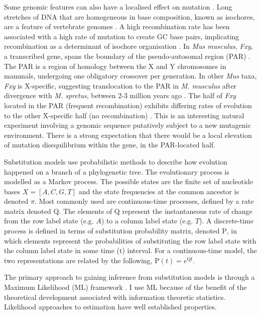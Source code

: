 Some genomic features can also have a localised effect on mutation \citep{Lynch2016GeneticRate}. Long stretches of DNA that are homogeneous in base composition, known as isochores, are a feature of vertebrate genomes \citep{Bernardi1989TheGenome, Bernardi2000IsochoresVertebrates}. A high recombination rate has been associated with a high rate of mutation to create GC base pairs, implicating recombination as a determinant of isochore organisation \citep{Montoya-Burgos2003RecombinationGenomes}. In  \textit{Mus musculus}, \textit{Fxy}, a transcribed gene, spans the boundary of the pseudo-autosomal region (PAR) \citep{Palmer1997AMice}. The PAR is a region of homology between the X and Y chromosomes in mammals, undergoing one obligatory crossover per generation.  In other \textit{Mus} taxa, \textit{Fxy} is X-specific, suggesting translocation to the PAR in \textit{M. musculus} after divergence with \textit{M. spretus}, between 2-3 million years ago \citep{Huang2005HowMammals}. The half of \textit{Fxy} located in the PAR (frequent recombination) exhibits differing rates of evolution to the other X-specific half (no recombination) \citep{Perry1999EvolutionaryPosition}. This is an interesting natural experiment involving a genomic sequence putatively subject to a new mutagenic environment. There is a strong expectation that there would be a local elevation of mutation disequilibrium within the gene, in the PAR-located half. 

Substitution models use probabilistic methods to describe how evolution happened on a branch of a phylogenetic tree. The evolutionary process is modelled as a Markov process. The possible states are the finite set of nucleotide bases $X = [A, C, G, T]$ and the state frequencies at the common ancestor is denoted $\pi$. Most commonly used are continuous-time processes, defined by a rate matrix denoted $\mathrm{Q}$. The elements of $\mathrm{Q}$ represent the instantaneous rate of change from the row label state (e.g. $A$) to a column label state (e.g. $T$). A discrete-time process is defined in terms of substitution probability matrix, denoted $\mathrm{P}$, in which elements represent the probabilities of substituting the row label state with the column label state in some time (t) interval. For a continuous-time model, the two representations are related by the following, $\mathrm{P}(t) = e^{\mathrm{Q}t}$. 

The primary approach to gaining inference from substitution models is through a Maximum Likelihood (ML) framework \citep{Whelan2001MolecularPast}. I use ML because of the benefit of the theoretical development associated with information theoretic statistics. Likelihood approaches to estimation have well established properties. 

